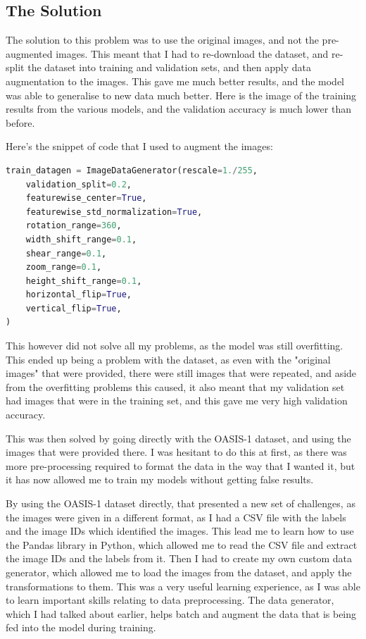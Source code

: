 \documentclass[]{final_report}
\begin{document}
\pagebreak

\subsection{The Solution}
The solution to this problem was to use the original images, and not the pre-augmented images.
This meant that I had to re-download the dataset, and re-split the dataset into training and validation sets,
and then apply data augmentation to the images. This gave me much better results, and the model was able to generalise
to new data much better. Here is the image of the training results from the various models, and the validation accuracy is much lower than before.

Here's the snippet of code that I used to augment the images:
\begin{lstlisting}[language=Python]
train_datagen = ImageDataGenerator(rescale=1./255,
    validation_split=0.2,
    featurewise_center=True,
    featurewise_std_normalization=True,
    rotation_range=360,
    width_shift_range=0.1,
    shear_range=0.1,
    zoom_range=0.1,
    height_shift_range=0.1,
    horizontal_flip=True,
    vertical_flip=True,
)
\end{lstlisting}

\pagebreak

This however did not solve all my problems, as the model was still overfitting. This ended up being a problem with the dataset, as even with the "original images" that were provided, there were still images that were repeated, and aside from the overfitting problems this caused, it also meant that my validation set had images that were in the training set, and this gave me very high validation accuracy.

This was then solved by going directly with the OASIS-1 dataset, and using the images that were provided there. I was hesitant to do this at first, as there was more pre-processing required to format the data in the way that I wanted it, but it has now allowed me to train my models without getting false results.

By using the OASIS-1 dataset directly, that presented a new set of challenges, as the images were given in a different format, as I had a CSV file with the labels and the image IDs which identified the images. This lead me to learn how to use the Pandas\cite{Pandas} library in Python, which allowed me to read the CSV file and extract the image IDs and the labels from it. Then I had to create my own custom data generator, which allowed me to load the images from the dataset, and apply the transformations to them. This was a very useful learning experience, as I was able to learn important skills relating to data preprocessing. The data generator, which I had talked about earlier, helps batch and augment the data that is being fed into the model during training.
\end{document}
